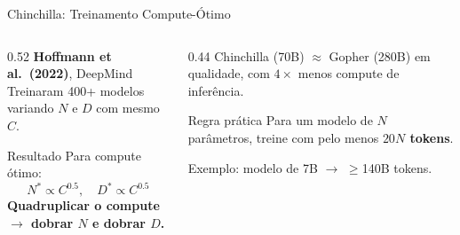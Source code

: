 \documentclass[aspectratio=169, xcolor=dvipsnames]{beamer}
\begin{document}
  \begin{frame}{Chinchilla: Treinamento Compute-Ótimo \cite{hoffmann2022chinchilla}}
    \begin{columns}[T]
      \begin{column}{0.52\textwidth}
        \textbf{Hoffmann et al.\ (2022)}, DeepMind\\[0.4em]
        Treinaram 400+ modelos variando $N$ e $D$ com mesmo $C$.\\[0.4em]
        \begin{block}{Resultado}
          Para compute ótimo:
          \[
            N^* \propto C^{0.5}, \quad D^* \propto C^{0.5}
          \]
          \textbf{Quadruplicar o compute $\to$ dobrar $N$ e dobrar $D$.}
        \end{block}
      \end{column}
      \begin{column}{0.44\textwidth}
        Chinchilla (70B) $\approx$ Gopher (280B) em qualidade, com $4\times$ menos compute de inferência.\\[0.5em]
        \begin{exampleblock}{Regra prática}
          Para um modelo de $N$ parâmetros, treine com pelo menos \textbf{$20N$ tokens}.
        \end{exampleblock}
        \vspace{0.3em}
        Exemplo: modelo de 7B $\to$ $\ge$140B tokens.
      \end{column}
    \end{columns}
  \end{frame}
\end{document}
